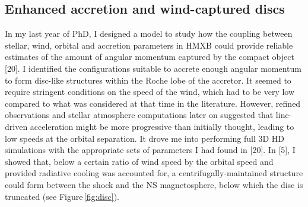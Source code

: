 \documentclass[letterpaper,12pt,onecolumn]{article}
\makeatletter
\newcommand*{\hmxb}{HMXB\@\xspace}
\newcommand*{\ns}{NS\@\xspace}
\makeatother
\begin{document}

\subsection*{Enhanced accretion and wind-captured discs}


\normalsize


In my last year of PhD, I designed a model to study how the coupling between stellar, wind, orbital and accretion parameters in \hmxb could provide reliable estimates of the amount of angular momentum captured by the compact object [20]. I identified the configurations suitable to accrete enough angular momentum to form disc-like structures within the Roche lobe of the accretor. It seemed to require stringent conditions on the speed of the wind, which had to be very low compared to what was considered at that time in the literature. However, refined observations and stellar atmosphere computations later on suggested that line-driven acceleration might be more progressive than initially thought, leading to low speeds at the orbital separation. It drove me into performing full 3D HD simulations with the appropriate sets of parameters I had found in [20]. In [5], I showed that, below a certain ratio of wind speed by the orbital speed and provided radiative cooling was accounted for, a centrifugally-maintained structure could form between the shock and the \ns magnetosphere, below which the disc is truncated (see Figure\,\ref{fig:disc}). 
\end{document}
